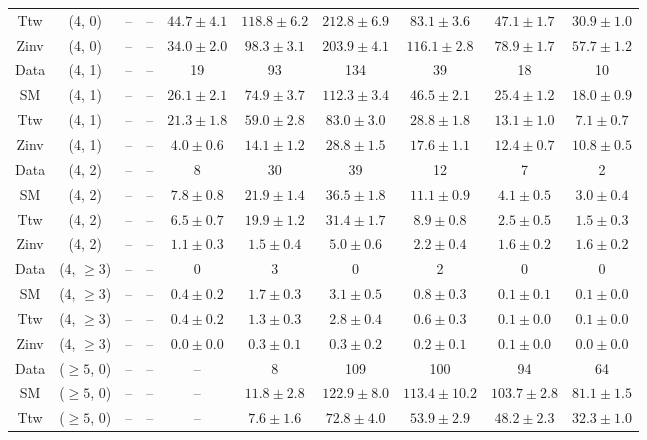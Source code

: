 \begin{table}[h!]
{\begin{tabular}{cccccccccc}
	Ttw & (4, 0) & -- & -- & $44.7\pm 4.1$ & $118.8\pm 6.2$ & $212.8\pm 6.9$ & $83.1\pm 3.6$ & $47.1\pm 1.7$ & $30.9\pm 1.0$ \\[0.5ex] 
	Zinv & (4, 0) & -- & -- & $34.0\pm 2.0$ & $98.3\pm 3.1$ & $203.9\pm 4.1$ & $116.1\pm 2.8$ & $78.9\pm 1.7$ & $57.7\pm 1.2$ \\[0.5ex] 
	Data & (4, 1) & -- & -- & 19 & 93 & 134 & 39 & 18 & 10 \\[0.5ex] 
	SM & (4, 1) & -- & -- & $26.1\pm 2.1$ & $74.9\pm 3.7$ & $112.3\pm 3.4$ & $46.5\pm 2.1$ & $25.4\pm 1.2$ & $18.0\pm 0.9$ \\[0.5ex] 
	Ttw & (4, 1) & -- & -- & $21.3\pm 1.8$ & $59.0\pm 2.8$ & $83.0\pm 3.0$ & $28.8\pm 1.8$ & $13.1\pm 1.0$ & $7.1\pm 0.7$ \\[0.5ex] 
	Zinv & (4, 1) & -- & -- & $4.0\pm 0.6$ & $14.1\pm 1.2$ & $28.8\pm 1.5$ & $17.6\pm 1.1$ & $12.4\pm 0.7$ & $10.8\pm 0.5$ \\[0.5ex] 
	Data & (4, 2) & -- & -- & 8 & 30 & 39 & 12 & 7 & 2 \\[0.5ex] 
	SM & (4, 2) & -- & -- & $7.8\pm 0.8$ & $21.9\pm 1.4$ & $36.5\pm 1.8$ & $11.1\pm 0.9$ & $4.1\pm 0.5$ & $3.0\pm 0.4$ \\[0.5ex] 
	Ttw & (4, 2) & -- & -- & $6.5\pm 0.7$ & $19.9\pm 1.2$ & $31.4\pm 1.7$ & $8.9\pm 0.8$ & $2.5\pm 0.5$ & $1.5\pm 0.3$ \\[0.5ex] 
	Zinv & (4, 2) & -- & -- & $1.1\pm 0.3$ & $1.5\pm 0.4$ & $5.0\pm 0.6$ & $2.2\pm 0.4$ & $1.6\pm 0.2$ & $1.6\pm 0.2$ \\[0.5ex] 
	Data & (4, $\ge3$) & -- & -- & 0 & 3 & 0 & 2 & 0 & 0 \\[0.5ex] 
	SM & (4, $\ge3$) & -- & -- & $0.4\pm 0.2$ & $1.7\pm 0.3$ & $3.1\pm 0.5$ & $0.8\pm 0.3$ & $0.1\pm 0.1$ & $0.1\pm 0.0$ \\[0.5ex] 
	Ttw & (4, $\ge3$) & -- & -- & $0.4\pm 0.2$ & $1.3\pm 0.3$ & $2.8\pm 0.4$ & $0.6\pm 0.3$ & $0.1\pm 0.0$ & $0.1\pm 0.0$ \\[0.5ex] 
	Zinv & (4, $\ge3$) & -- & -- & $0.0\pm 0.0$ & $0.3\pm 0.1$ & $0.3\pm 0.2$ & $0.2\pm 0.1$ & $0.1\pm 0.0$ & $0.0\pm 0.0$ \\[0.5ex] 
	Data & ($\ge5$, 0) & -- & -- & -- & 8 & 109 & 100 & 94 & 64 \\[0.5ex] 
	SM & ($\ge5$, 0) & -- & -- & -- & $11.8\pm 2.8$ & $122.9\pm 8.0$ & $113.4\pm 10.2$ & $103.7\pm 2.8$ & $81.1\pm 1.5$ \\[0.5ex] 
	Ttw & ($\ge5$, 0) & -- & -- & -- & $7.6\pm 1.6$ & $72.8\pm 4.0$ & $53.9\pm 2.9$ & $48.2\pm 2.3$ & $32.3\pm 1.0$ \\[0.5ex] 

\end{tabular}}
\end{table}
